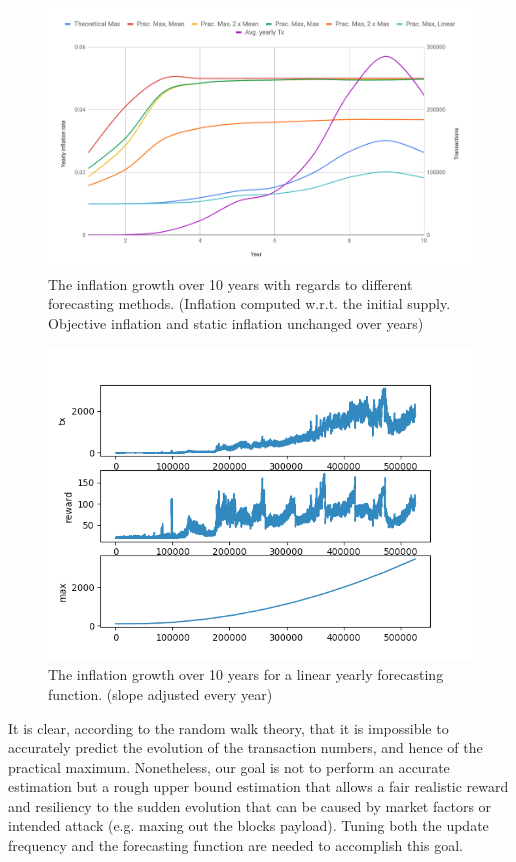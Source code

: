 \documentclass[conference]{IEEEtran}
\begin{document}
\begin{figure}[h]
	\includegraphics[width=\linewidth, trim= 0cm 1cm 0cm 1cm, clip]{Figures/expU.png}
	\caption{The inflation growth over 10 years with regards to different forecasting methods. (Inflation computed w.r.t. the initial supply. Objective inflation and static inflation unchanged over years)}
	\label{fig:sim}
\end{figure}

\begin{figure}[]
	\includegraphics[width=\linewidth, trim= 0cm 0cm 0cm 0cm, clip]{Figures/Figure_continuous.png}
	\caption{The inflation growth over 10 years for a linear yearly forecasting function. (slope adjusted every year)}
	\label{fig:sim}
\end{figure}

It is clear, according to the random walk theory, that it is impossible to accurately predict the evolution of the transaction numbers, and hence of the practical maximum. Nonetheless, our goal is not to perform an accurate estimation but a rough upper bound estimation that allows a fair realistic reward and resiliency to the sudden evolution that can be caused by market factors or intended attack (e.g. maxing out the blocks payload). Tuning both the update frequency and the forecasting function are needed to accomplish this goal.
\end{document}
